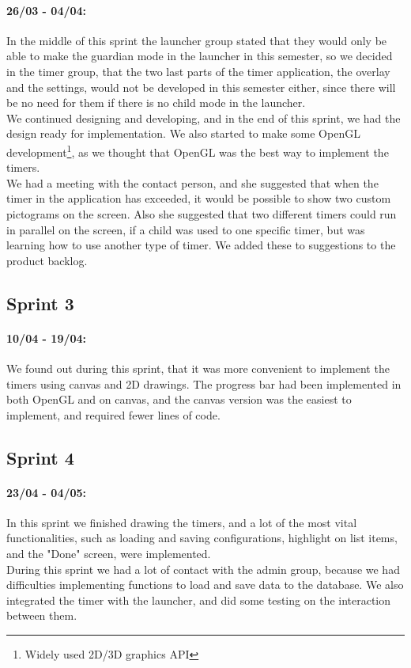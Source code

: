 \paragraph{26/03 - 04/04:}
In the middle of this sprint the launcher group stated that they would only be able to make the guardian mode in the launcher in this semester, so we decided in the timer group, that the two last parts of the timer application, the overlay and the settings, would not be developed in this semester either, since there will be no need for them if there is no child mode in the launcher.\\
	We continued designing and developing, and in the end of this sprint, we had the design ready for implementation. We also started to make some OpenGL development\footnote{Widely used 2D/3D graphics API}, as we thought that OpenGL was the best way to implement the timers.\\
	We had a meeting with the contact person, and she suggested that when the timer in the application has exceeded, it would be possible to show two custom pictograms on the screen. Also she suggested that two different timers could run in parallel on the screen, if a child was used to one specific timer, but was learning how to use another type of timer. We added these to suggestions to the product backlog.

\subsection*{Sprint 3}
\paragraph{10/04 - 19/04:}
We found out during this sprint, that it was more convenient to implement the timers using canvas and 2D drawings. The progress bar had been implemented in both OpenGL and on canvas, and the canvas version was the easiest to implement, and required fewer lines of code.	

\subsection*{Sprint 4}
\paragraph{23/04 - 04/05:}
In this sprint we finished drawing the timers, and a lot of the most vital functionalities, such as loading and saving configurations, highlight on list items, and the "Done" screen, were implemented.\\
	During this sprint we had a lot of contact with the admin group, because we had difficulties implementing functions to load and save data to the database. We also integrated the timer with the launcher, and did some testing on the interaction between them.

